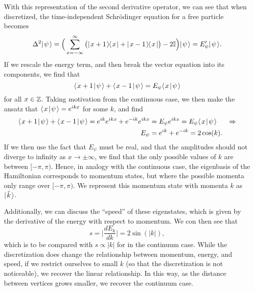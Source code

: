 \documentclass[../thesis-main/thesis-main]{subfiles}
\begin{document}
With this representation of the second derivative operator, we can see that when discretized, the time-independent Schr\"{o}dinger equation for a free particle becomes
\begin{equation}
  \Delta^2 |\mspace{2mu} \psi \mspace{2mu} \rangle = \Big(\sum_{x=-\infty}^\infty \big(|\mspace{2mu} x+1 \mspace{2mu} \rangle\mspace{-2mu}\langle\mspace{2mu} x \mspace{2mu} | + |\mspace{2mu} x-1 \mspace{2mu} \rangle\mspace{-2mu}\langle\mspace{2mu} x \mspace{2mu} |\big) - 2 \mathbb{I}\Big) |\mspace{2mu} \psi \mspace{2mu} \rangle = E'_{\psi} |\mspace{2mu} \psi \mspace{2mu} \rangle.
\end{equation}
If we rescale the energy term, and then break the vector equation into its components, we find that
\begin{equation}
  \langle\mspace{2mu} x+1 \mspace{2mu} | \mspace{2mu} \psi\mspace{2mu} \rangle + \langle\mspace{2mu} x-1 \mspace{2mu} | \mspace{2mu} \psi\mspace{2mu} \rangle = E_\psi \langle\mspace{2mu} x \mspace{2mu} | \mspace{2mu} \psi\mspace{2mu} \rangle
\end{equation}
for all $x\in \mathbb{Z}$.  Taking motivation from the continuous case,  we then make the ansatz that $\langle\mspace{2mu} x \mspace{2mu} | \mspace{2mu} \psi\mspace{2mu} \rangle = e^{i k x}$ for some $k$, and find
\begin{align}
  \langle\mspace{2mu} x+1 \mspace{2mu} | \mspace{2mu} \psi\mspace{2mu} \rangle + \langle\mspace{2mu} x-1 \mspace{2mu} | \mspace{2mu} \psi\mspace{2mu} \rangle = e^{i k } e^{i k x} + e^{-ik} e^{ikx} &= E_\psi e^{ik x} = E_\psi \langle\mspace{2mu} x \mspace{2mu} | \mspace{2mu} \psi\mspace{2mu} \rangle &\Rightarrow \\ E_\psi &= e^{ik} + e^{-i k} = 2 \cos(k).
\end{align}
If we then use the fact that $E_\psi$ must be real, and that the amplitudes should not diverge to infinity as $x\rightarrow \pm \infty$, we find that the only possible values of $k$ are between $[-\pi,\pi)$.    Hence, in analogy with the continuous case, the eigenbasis of the Hamiltonian corresponds to momentum states, but where the possible momenta only range over $[-\pi,\pi)$.  We represent this momentum state with momenta $k$ as $|\mspace{2mu} \tilde{k} \mspace{2mu} \rangle$.

Additionally, we can discuss the ``speed'' of these eigenstates, which is given by the derivative of the energy with respect to momentum.  We con then see that 
\begin{equation}
  s = \Big| \frac{d E_k}{d k} \Big| = 2 \sin (|k|),
\end{equation}
which is to be compared with $s \propto |k|$ for in the continuum case.  While the discretization does change the relationship between momentum, energy, and speed, if we restrict ourselves to small $k$ (so that the discretization is not noticeable), we recover the linear relationship.  In this way, as the distance between vertices grows smaller, we recover the continuum case.  
\end{document}
